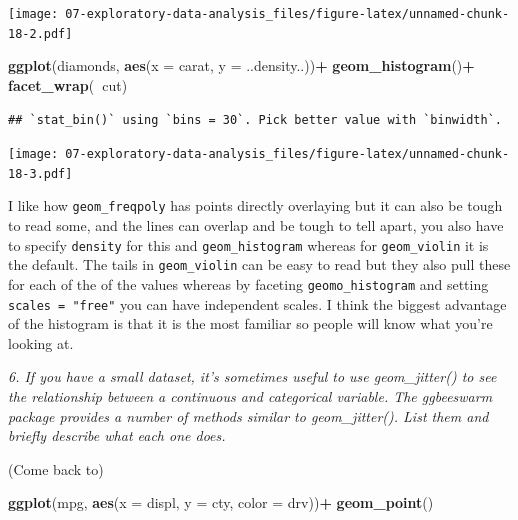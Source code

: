 \documentclass[]{book}
\newenvironment{Shaded}{\begin{snugshade}}{\end{snugshade}}
\newcommand{\DataTypeTok}[1]{\textcolor[rgb]{0.13,0.29,0.53}{#1}}
\newcommand{\KeywordTok}[1]{\textcolor[rgb]{0.13,0.29,0.53}{\textbf{#1}}}
\newcommand{\NormalTok}[1]{#1}
\newcommand{\OperatorTok}[1]{\textcolor[rgb]{0.81,0.36,0.00}{\textbf{#1}}}
\newcommand{\StringTok}[1]{\textcolor[rgb]{0.31,0.60,0.02}{#1}}
\theoremstyle{definition}
\theoremstyle{definition}
\theoremstyle{definition}
\theoremstyle{remark}
\begin{document}
\texttt{[image: 07-exploratory-data-analysis\_files/figure-latex/unnamed-chunk-18-2.pdf]}

\begin{Shaded}
\begin{Highlighting}[]
\KeywordTok{ggplot}\NormalTok{(diamonds, }\KeywordTok{aes}\NormalTok{(}\DataTypeTok{x =}\NormalTok{ carat, }\DataTypeTok{y =}\NormalTok{ ..density..))}\OperatorTok{+}
\StringTok{  }\KeywordTok{geom_histogram}\NormalTok{()}\OperatorTok{+}
\StringTok{  }\KeywordTok{facet_wrap}\NormalTok{(}\OperatorTok{~}\NormalTok{cut)}
\end{Highlighting}
\end{Shaded}

\begin{verbatim}
## `stat_bin()` using `bins = 30`. Pick better value with `binwidth`.
\end{verbatim}

\texttt{[image: 07-exploratory-data-analysis\_files/figure-latex/unnamed-chunk-18-3.pdf]}

I like how \texttt{geom\_freqpoly} has points directly overlaying but it
can also be tough to read some, and the lines can overlap and be tough
to tell apart, you also have to specify \texttt{density} for this and
\texttt{geom\_histogram} whereas for \texttt{geom\_violin} it is the
default. The tails in \texttt{geom\_violin} can be easy to read but they
also pull these for each of the of the values whereas by faceting
\texttt{geomo\_histogram} and setting \texttt{scales\ =\ "free"} you can
have independent scales. I think the biggest advantage of the histogram
is that it is the most familiar so people will know what you're looking
at.

\emph{6. If you have a small dataset, it's sometimes useful to use
geom\_jitter() to see the relationship between a continuous and
categorical variable. The ggbeeswarm package provides a number of
methods similar to geom\_jitter(). List them and briefly describe what
each one does.}

(Come back to)

\begin{Shaded}
\begin{Highlighting}[]
\KeywordTok{ggplot}\NormalTok{(mpg, }\KeywordTok{aes}\NormalTok{(}\DataTypeTok{x =}\NormalTok{ displ, }\DataTypeTok{y =}\NormalTok{ cty, }\DataTypeTok{color =}\NormalTok{ drv))}\OperatorTok{+}
\StringTok{  }\KeywordTok{geom_point}\NormalTok{()    }
\end{Highlighting}
\end{Shaded}
\end{document}
